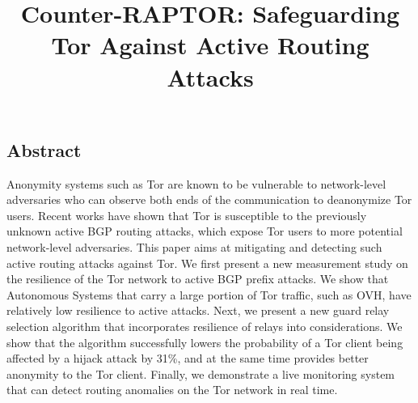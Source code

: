 \documentclass[letterpaper,twocolumn,10pt]{article}
\begin{document}
\date{}

\title{\Large \bf Counter-RAPTOR: Safeguarding Tor Against Active Routing Attacks}


\maketitle

\thispagestyle{empty}

\subsection*{Abstract}
Anonymity systems such as Tor are known to be vulnerable to network-level adversaries who can observe both ends of the communication to deanonymize Tor users. Recent works have shown that Tor is susceptible to the previously unknown active BGP routing attacks, which expose Tor users to more potential network-level adversaries. This paper aims at mitigating and detecting such active routing attacks against Tor. We first present a new measurement study on the resilience of the Tor network to active BGP prefix attacks. We show that Autonomous Systems that carry a large portion of Tor traffic, such as OVH, have relatively low resilience to active attacks. Next, we present a new guard relay selection algorithm that incorporates resilience of relays into considerations. We show that the algorithm successfully lowers the probability of a Tor client being affected by a hijack attack by 31\%, and at the same time provides better anonymity to the Tor client. Finally, we demonstrate a live monitoring system that can detect routing anomalies on the Tor network in real time. 








%
%


{\footnotesize 
}

\end{document}
